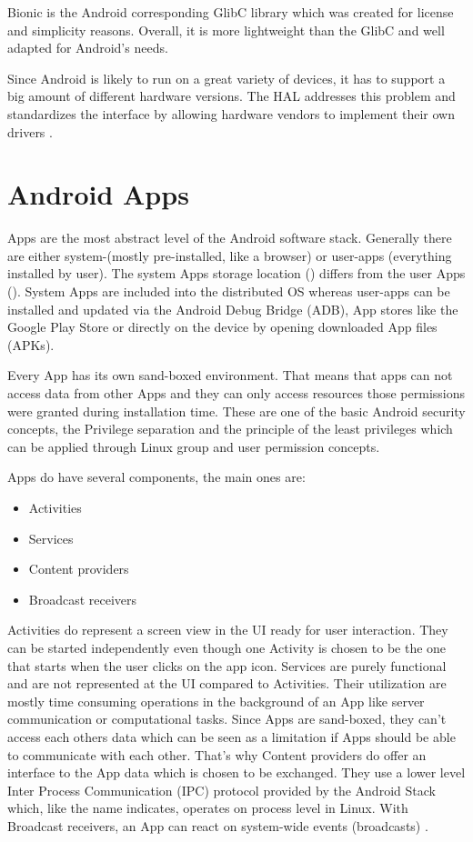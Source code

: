 Bionic is the Android corresponding GlibC library which was created
for license and simplicity reasons. Overall, it is more lightweight
than the GlibC and well adapted for Android's needs.

Since Android is likely to run on a great variety of devices,
it has to support a big amount of different hardware versions.
The HAL addresses this problem and
standardizes the interface by allowing hardware vendors
to implement their own drivers \parencite[p.18f]{levin}.

\section{Android Apps}\label{section:android_apps}
Apps are the most abstract level of the Android software stack.
Generally there are either system-(mostly pre-installed, like a browser)
or user-apps (everything installed by user).
The system Apps storage location () differs from
the user Apps (). System Apps are included into the
distributed OS whereas user-apps can be installed and updated
via the Android Debug Bridge (ADB), App stores
like the Google Play Store or directly on the device by opening
downloaded App files (APKs).

Every App has its own sand-boxed environment. That means that
apps can not access data from other Apps and they can only access
resources those permissions were granted during installation time.
These are one of the basic Android security concepts,
the Privilege separation and the principle of the least
privileges \parencite[ch.1]{securityinternals} which can be applied through
Linux group and user permission concepts.

Apps do have several components, the main ones are:

\begin{itemize}
\item Activities
\item Services
\item Content providers
\item Broadcast receivers
\end{itemize}

Activities do represent a screen view in the UI ready for user
interaction. They can be started independently even though one Activity
is chosen to be the one that starts when the user clicks on the
app icon. Services are purely functional and are not represented
at the UI compared to Activities. Their utilization are mostly time
consuming operations in the background of an App like server
communication or computational tasks. Since Apps are sand-boxed,
they can't access each others data which can be seen as a limitation
if Apps should be able to communicate with each other.
That's why Content providers do offer an interface to the App
data which is chosen to be exchanged.
They use a lower level Inter Process Communication (IPC) protocol
provided by the Android Stack which, like the name indicates, operates
on process level in Linux.
With Broadcast receivers, an App can react on system-wide events
(broadcasts) \parencite[ch.1]{securityinternals}.

